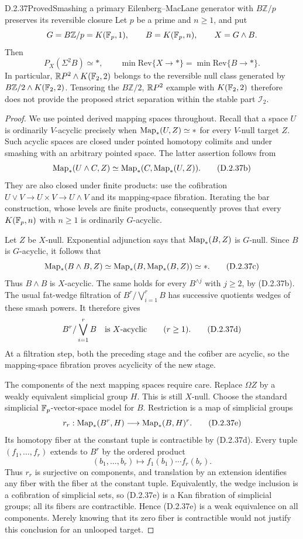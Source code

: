 \begin{claim}{D.2.37}{Proved}{Smashing a primary Eilenberg--MacLane generator with $B\mathbb Z/p$ preserves its reversible closure}
Let $p$ be a prime and $n\geq1$, and put
\[
 G=B\mathbb Z/p=K(\mathbb F_p,1),\qquad
 B=K(\mathbb F_p,n),\qquad X=G\wedge B.
\]
Then
\[
 P_X(\Sigma^2B)\simeq *,\qquad
 \min\mathrm{Rev}\{X\to *\}
       =\min\mathrm{Rev}\{B\to *\}.
 \tag{D.2.37a}
\]
In particular, $\mathbb{R}P^2\wedge K(\mathbb F_2,2)$ belongs to the
reversible null class generated by
$B\mathbb Z/2\wedge K(\mathbb F_2,2)$. Tensoring the
$B\mathbb Z/2$, $\mathbb{R}P^2$ example with $K(\mathbb F_2,2)$ therefore
does not provide the proposed strict separation within the
stable part $\mathcal I_2$.
\end{claim}
\begin{proof}
We use pointed derived mapping spaces throughout. Recall that
a space $U$ is ordinarily $V$-acyclic precisely when
$\operatorname{Map}_*(U,Z)\simeq *$ for every $V$-null target $Z$.
Such acyclic spaces are closed under pointed homotopy colimits
and under smashing with an arbitrary pointed space. The latter
assertion follows from
\[
 \operatorname{Map}_*(U\wedge C,Z)
       \simeq\operatorname{Map}_*(C,\operatorname{Map}_*(U,Z)).
 \tag{D.2.37b}
\]
They are also closed under finite products: use the cofibration
$U\vee V\to U\times V\to U\wedge V$ and its mapping-space
fibration. Iterating the bar construction, whose levels are
finite products, consequently proves that every
$K(\mathbb F_p,n)$ with $n\geq1$ is ordinarily $G$-acyclic.

Let $Z$ be $X$-null. Exponential adjunction says that
$\operatorname{Map}_*(B,Z)$ is $G$-null. Since $B$ is $G$-acyclic, it follows
that
\[
 \operatorname{Map}_*(B\wedge B,Z)
    \simeq\operatorname{Map}_*(B,\operatorname{Map}_*(B,Z))\simeq *.
 \tag{D.2.37c}
\]
Thus $B\wedge B$ is $X$-acyclic. The same holds for every
$B^{\wedge j}$ with $j\geq2$, by \textup{(D.2.37b)}.
The usual fat-wedge filtration of $B^r/\bigvee_{i=1}^r B$
has successive quotients wedges of these smash powers. It
therefore gives
\[
          B^r/\bigvee_{i=1}^rB\quad\hbox{is $X$-acyclic}
          \qquad(r\geq1).
          \tag{D.2.37d}
\]
At a filtration step, both the preceding stage and the
cofiber are acyclic, so the mapping-space fibration proves
acyclicity of the new stage.

The components of the next mapping spaces require care.
Replace $\Omega Z$ by a weakly equivalent simplicial group
$H$. This is still $X$-null. Choose the standard simplicial
$\mathbb F_p$-vector-space model for $B$. Restriction is a map of
simplicial groups
\[
 r_r:\operatorname{Map}_*(B^r,H)\longrightarrow
             \operatorname{Map}_*(B,H)^r.
 \tag{D.2.37e}
\]
Its homotopy fiber at the constant tuple is contractible by
\textup{(D.2.37d)}. Every tuple $(f_1,\ldots,f_r)$ extends to
$B^r$ by the ordered product
\[
       (b_1,\ldots,b_r)\longmapsto
                          f_1(b_1)\cdots f_r(b_r).
 \tag{D.2.37f}
\]
Thus $r_r$ is surjective on components, and translation by
an extension identifies any fiber with the fiber at the
constant tuple. Equivalently, the wedge inclusion is a
cofibration of simplicial sets, so \textup{(D.2.37e)} is a
Kan fibration of simplicial groups; all its fibers are
contractible. Hence \textup{(D.2.37e)} is a weak equivalence
on all components. Merely knowing that its zero fiber is
contractible would not justify this conclusion for an
unlooped target.


\end{proof}
